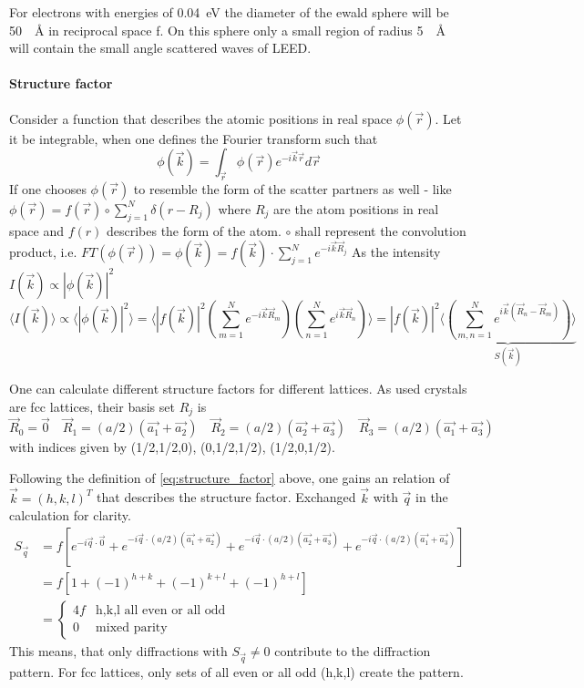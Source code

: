 For electrons with energies of \SI{0.04}{\eV} the diameter of the ewald sphere will be \SI{50}{\per \angstrom} in reciprocal space f. On this sphere only a small region of radius \SI{5}{\per \angstrom} will contain the small angle scattered waves of LEED.

\paragraph{Structure factor}
Consider a function that describes the atomic positions in real space $\phi(\vec r)$. Let it be integrable, when one defines the Fourier transform such that 
\begin{equation}\label{eq:structure_factor}
\phi(\vec k)=\int_{\vec r} \phi(\vec r)e^{-i\vec k \vec r}d\vec r 
\end{equation}
If one chooses $\phi(\vec r)$ to resemble the form of the scatter partners as well - like $\phi(\vec r)=f(\vec r)\circ \sum_{j=1}^N\delta(r-R_j)$ where $R_j$ are the atom positions in real space and $f(r)$ describes the form of the atom. $\circ$ shall represent the convolution product, i.e. $FT(\phi(\vec r))=\phi(\vec k)=f(\vec k)\cdot \sum_{j=1}^N e^{-i\vec k \vec R_j}$ As the intensity $I(\vec k)\varpropto |\phi(\vec k)|^2$
$$\langle I(\vec k) \rangle \varpropto 
\langle |\phi(\vec k)|^2 \rangle =
\langle |f(\vec k)|^2 \left( \sum_{m=1}^N e^{-i\vec k \vec R_m} \right) \left( \sum_{n=1}^N e^{i\vec k \vec R_n}
\right) \rangle=|f(\vec k)|^2 \underbrace{\langle \left( \sum_{m,n=1}^N e^{i\vec k (\vec R_n-\vec R_m)} \right) \rangle }_{S(\vec k)}$$

One can calculate different structure factors for different lattices. As used crystals are fcc lattices, their basis set $R_j$ is 
$$ \vec{R}_0 = \vec{0} \quad
 \vec{R}_1 = (a/2)(\vec{a_1} + \vec{a_2})\quad
 \vec{R}_2 = (a/2)(\vec{a_2} + \vec{a_3})\quad
 \vec{R}_3 = (a/2)(\vec{a_1} + \vec{a_3})$$ with indices given by (1/2,1/2,0), (0,1/2,1/2), (1/2,0,1/2).

Following the definition of \eqref{eq:structure_factor} above, one gains an relation of $\vec {k}=(h,k,l)^T$ that describes the structure factor. Exchanged $\vec k$ with $\vec q$ in the calculation for clarity.
\begin{align*}
S_{\vec{q}} &=  f \left[ e^{-i\vec{q}\cdot\vec{0}} + e^{-i\vec{q}\cdot(a/2)(\vec{a_1} + \vec{a_2})} + e^{-i\vec{q}\cdot(a/2)(\vec{a_2} + \vec{a_3})} + e^{-i\vec{q}\cdot(a/2)(\vec{a_1} + \vec{a_3})} \right] \\
&= f \left[ 1 + (-1)^{h + k} + (-1)^{k + l} + (-1)^{h + l} \right] \\
&=  \begin{cases} 4f &\mbox{h,k,l all even or all odd}\\
                  0 &\mbox{mixed parity} \end{cases}
\end{align*}
This means, that only diffractions with $S_{\vec q}\neq 0$ contribute to the diffraction pattern. For fcc lattices, only sets of all even or all odd (h,k,l) create the pattern. 


